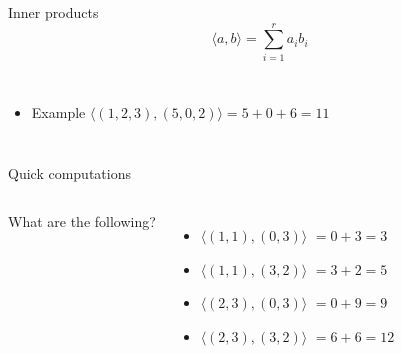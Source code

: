 \documentclass[aspectratio=169,usenames,dvipsnames]{beamer}
\newcommand{\InstructorNotes}[1]{\textit{\color{orange}#1}}
\newcommand{\InstructorList}[1]{
\begin{itemize}
	\color{orange}
	#1
\end{itemize}
}
\begin{document}
\begin{frame}[t]{Inner products}
\begin{equation*}
	\langle a,b \rangle = \sum_{i=1}^r a_ib_i
\end{equation*}
\begin{columns}
\centering

\InstructorList{
\item Example $\langle (1,2,3), (5,0,2)\rangle= 5 + 0 + 6 = 11 $

}

\centering


\end{columns}

\end{frame}


{
\begin{frame}[t]{Quick computations}
\begin{columns}
\centering
What are the following? 
\begin{itemize}
	\item $\langle (1,1), (0,3) \rangle$ 
	\InstructorNotes{$=0+3=3$}
	\item $\langle (1,1), (3,2) \rangle$
	\InstructorNotes{$=3+2=5$}
	\item $\langle (2,3), (0,3) \rangle$
	\InstructorNotes{$=0+9=9$}
	\item $\langle (2,3), (3,2) \rangle$
	\InstructorNotes{$=6+6=12$}
\end{itemize}
\centering
\end{columns}
\end{frame}
}
\end{document}
